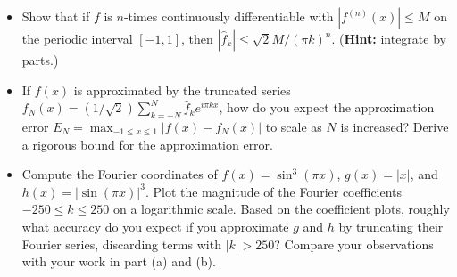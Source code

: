 \documentclass[12pt]{article}
\begin{document}
\begin{itemize}
    \item[\textbf{(a)}] Show that if $f$ is $n$-times continuously differentiable with $|f^{(n)}(x)|\leq M$ on the periodic interval $[-1,1]$, then $|\hat f_k| \leq \sqrt{2}M/(\pi k)^n$. (\textbf{Hint:} integrate by parts.) 

	\item[\textbf{(b)}] If $f(x)$ is approximated by the truncated series $f_N(x) = (1/\sqrt{2})\sum_{k=-N}^N\hat f_k e^{i\pi k x}$, how do you expect the approximation error $E_N=\max_{-1\leq x\leq 1}|f(x)-f_N(x)|$ to scale as $N$ is increased? Derive a rigorous bound for the approximation error.

    \item[\textbf{(c)}] Compute the Fourier coordinates of $f(x) = \sin^3(\pi x)$, $g(x) = |x|$, and $h(x) = |\sin(\pi x)|^3$. Plot the magnitude of the Fourier coefficients $-250\leq k\leq 250$ on a logarithmic scale. Based on the coefficient plots, roughly what accuracy do you expect if you approximate $g$ and $h$ by truncating their Fourier series, discarding terms with $|k|>250$? Compare your observations with your work in part (a) and (b).
    
\end{itemize}
\end{document}
